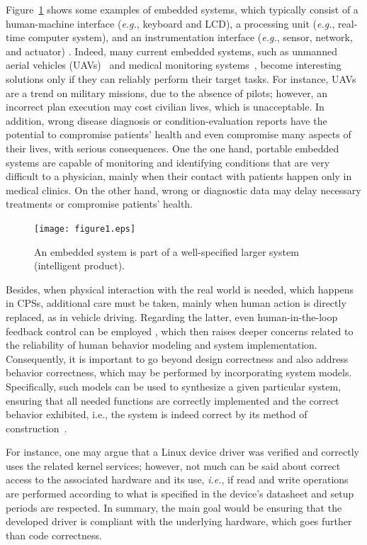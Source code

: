 \documentclass{acm_sen_article}
\begin{document}
Figure~\ref{intelligent-product} shows some examples of embedded systems, which typically consist of a human-machine interface ({\it e.g.}, keyboard and LCD), a processing unit ({\it e.g.}, real-time computer system), and an instrumentation interface ({\it e.g.}, sensor, network, and actuator) \cite{Kopetz11}. Indeed, many current embedded systems, such as unmanned aerial vehicles (UAVs)~\cite{groza2015formal} and medical monitoring systems~\cite{Cordeiro09}, become interesting solutions only if they can reliably perform their target tasks. For instance, UAVs are a trend on military missions, due to the absence of pilots; however, an incorrect plan execution may cost civilian lives, which is unacceptable. In addition, wrong disease diagnosis or condition-evaluation reports have the potential to compromise patients' health and even compromise many aspects of their lives, with serious consequences. One the one hand, portable embedded systems are capable of monitoring and identifying conditions that are very difficult to a physician, mainly when their contact with patients happen only in medical clinics. On the other hand, wrong or diagnostic data may delay necessary treatments or compromise patients' health. 
%
\begin{figure}[!t]
	\centering
	\texttt{[image: figure1.eps]}
	\caption{An embedded system is part of a well-specified larger system (intelligent product).}
	\label{intelligent-product}
\end{figure}

Besides, when physical interaction with the real world is needed, which happens in CPSs, additional care must be taken, mainly when human action is directly replaced, as in vehicle driving. Regarding the latter, even human-in-the-loop feedback control can be employed \cite{munir}, which then raises deeper concerns related to the reliability of human behavior modeling and system implementation. Consequently, it is important to go beyond design correctness and also address behavior correctness, which may be performed by incorporating system models. Specifically, such models can be used to synthesize a given particular system, ensuring that all needed functions are correctly implemented and the correct behavior exhibited, {i.e.}, the system is indeed correct by its method of construction~\cite{Abate17}.

For instance, one may argue that a Linux device driver \cite{ldd} was verified and correctly uses the related kernel services; however, not much can be said about correct access to the associated hardware and its use, {\it i.e.}, if read and write operations are performed according to what is specified in the device's datasheet and setup periods are respected. In summary, the main goal would be ensuring that the developed driver is compliant with the underlying hardware, which goes further than code correctness.
\end{document}
